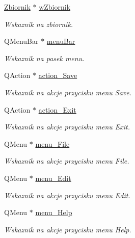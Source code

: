 \begin{DoxyCompactItemize}
\item 
\hyperlink{class_zbiornik}{Zbiornik} $\ast$ \hyperlink{class_okno_glowne_af2d1275209898ebdd5ab9de8ef78dffd}{w\-Zbiornik}
\begin{DoxyCompactList}\small\item\em Wskaznik na zbiornik. \end{DoxyCompactList}\item 
Q\-Menu\-Bar $\ast$ \hyperlink{class_okno_glowne_a5a87098d9d4bd868670f5a5e72023a0a}{menu\-Bar}
\begin{DoxyCompactList}\small\item\em Wskaznik na pasek menu. \end{DoxyCompactList}\item 
Q\-Action $\ast$ \hyperlink{class_okno_glowne_a2c2d825b6e5e0faa5eb368be4fc73b78}{action\-\_\-\-Save}
\begin{DoxyCompactList}\small\item\em Wskaznik na akcje przycisku menu Save. \end{DoxyCompactList}\item 
Q\-Action $\ast$ \hyperlink{class_okno_glowne_a579ef9901f57057368cb522ea5a9a5c3}{action\-\_\-\-Exit}
\begin{DoxyCompactList}\small\item\em Wskaznik na akcje przycisku menu Exit. \end{DoxyCompactList}\item 
Q\-Menu $\ast$ \hyperlink{class_okno_glowne_a1ba162db2d0b06b0f8963e61b3806875}{menu\-\_\-\-File}
\begin{DoxyCompactList}\small\item\em Wskaznik na akcje przycisku menu File. \end{DoxyCompactList}\item 
Q\-Menu $\ast$ \hyperlink{class_okno_glowne_a93afadd0ec22ce6a7e29acc5dd2423a2}{menu\-\_\-\-Edit}
\begin{DoxyCompactList}\small\item\em Wskaznik na akcje przycisku menu Edit. \end{DoxyCompactList}\item 
Q\-Menu $\ast$ \hyperlink{class_okno_glowne_ab17be6714913af0cdf4e7de7cb6210d1}{menu\-\_\-\-Help}
\begin{DoxyCompactList}\small\item\em Wskaznik na akcje przycisku menu Help. \end{DoxyCompactList}\item 

\end{DoxyCompactItemize}

